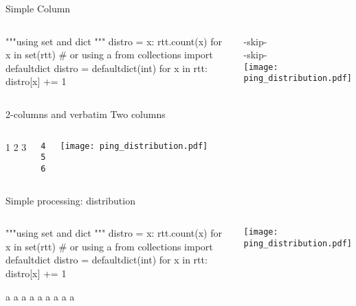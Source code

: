 \begin{frame}[fragile]{Simple Column}
\begin{columns}
\column[t]{5cm}
\begin{pythoncode}
"""using set and dict
"""
distro = {x: rtt.count(x) 
  for x in set(rtt)}
# or using a
from collections import defaultdict
distro = defaultdict(int)
for x in rtt:
    distro[x] += 1
    

\end{pythoncode}
\column[t]{5cm}
-skip-\\
-skip-\\
\texttt{[image: ping\_distribution.pdf]}  
\end{columns}
\end{frame}


\begin{frame}[fragile]{2-columns and verbatim}
Two columns
\begin{columns}

\column[t]{5cm}
1
2
3
\begin{verbatim}
4
5
6
\end{verbatim}

\column[t]{5cm}
\texttt{[image: ping\_distribution.pdf]}  
\end{columns}

\end{frame}



\begin{frame}[fragile]{Simple processing: distribution}
\begin{columns}
\column[t]{5cm}
\begin{pythoncode}
"""using set and dict
"""
distro = {x: rtt.count(x) 
  for x in set(rtt)}
# or using a
from collections import defaultdict
distro = defaultdict(int)
for x in rtt:
    distro[x] += 1
    
a
a
a
a
a
a
a
a
a

    
    
    
    
\end{pythoncode}
\column[t]{5cm}
\texttt{[image: ping\_distribution.pdf]}  
\end{columns}
\end{frame}
